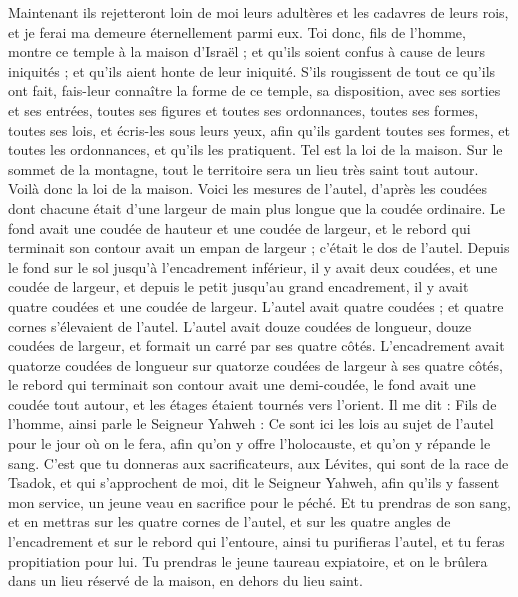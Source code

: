 \begin{multicols}{2}
Maintenant ils rejetteront loin de moi leurs adultères et les cadavres de leurs rois, et je ferai ma demeure éternellement parmi eux.
Toi donc, fils de l'homme, montre ce temple à la maison d'Israël ; et qu'ils soient confus à cause de leurs iniquités ; et qu'ils aient honte de leur iniquité.
S'ils rougissent de tout ce qu'ils ont fait, fais-leur connaître la forme de ce temple, sa disposition, avec ses sorties et ses entrées, toutes ses figures et toutes ses ordonnances, toutes ses formes, toutes ses lois, et écris-les sous leurs yeux, afin qu'ils gardent toutes ses formes, et toutes les ordonnances, et qu'ils les pratiquent.
Tel est la loi de la maison. Sur le sommet de la montagne, tout le territoire sera un lieu très saint tout autour. Voilà donc la loi de la maison.
Voici les mesures de l'autel, d'après les coudées dont chacune était d'une largeur de main plus longue que la coudée ordinaire. Le fond avait une coudée de hauteur et une coudée de largeur, et le rebord qui terminait son contour avait un empan de largeur ; c'était le dos de l'autel.
Depuis le fond sur le sol jusqu'à l'encadrement inférieur, il y avait deux coudées, et une coudée de largeur, et depuis le petit jusqu'au grand encadrement, il y avait quatre coudées et une coudée de largeur.
L'autel avait quatre coudées ; et quatre cornes s'élevaient de l'autel.
L'autel avait douze coudées de longueur, douze coudées de largeur, et formait un carré par ses quatre côtés.
L'encadrement avait quatorze coudées de longueur sur quatorze coudées de largeur à ses quatre côtés, le rebord qui terminait son contour avait une demi-coudée, le fond avait une coudée tout autour, et les étages étaient tournés vers l'orient.
Il me dit : Fils de l'homme, ainsi parle le Seigneur Yahweh : Ce sont ici les lois au sujet de l'autel pour le jour où on le fera, afin qu'on y offre l'holocauste, et qu'on y répande le sang.
C'est que tu donneras aux sacrificateurs, aux Lévites, qui sont de la race de Tsadok, et qui s'approchent de moi, dit le Seigneur Yahweh, afin qu'ils y fassent mon service, un jeune veau en sacrifice pour le péché.
Et tu prendras de son sang, et en mettras sur les quatre cornes de l'autel, et sur les quatre angles de l'encadrement et sur le rebord qui l'entoure, ainsi tu purifieras l'autel, et tu feras propitiation pour lui.
Tu prendras le jeune taureau expiatoire, et on le brûlera dans un lieu réservé de la maison, en dehors du lieu saint.

\end{multicols}
